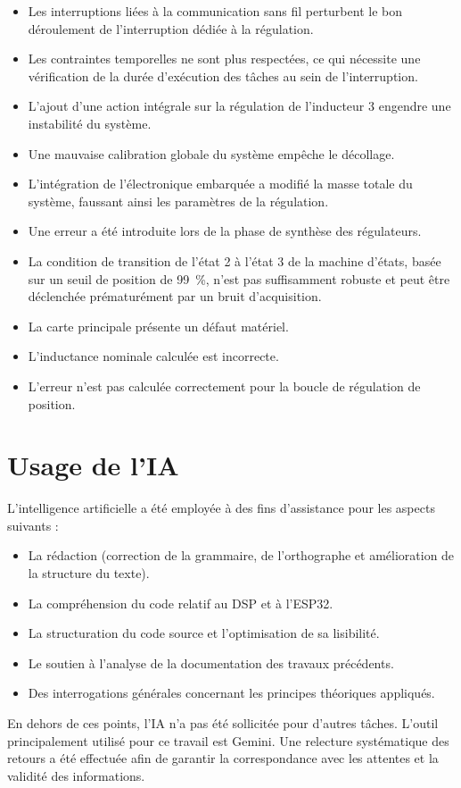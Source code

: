 \begin{itemize}
    \item Les interruptions liées à la communication sans fil perturbent le bon déroulement de l'interruption dédiée à la régulation.
    \item Les contraintes temporelles ne sont plus respectées, ce qui nécessite une vérification de la durée d'exécution des tâches au sein de l'interruption.
    \item L'ajout d'une action intégrale sur la régulation de l'inducteur 3 engendre une instabilité du système.
    \item Une mauvaise calibration globale du système empêche le décollage.
    \item L'intégration de l'électronique embarquée a modifié la masse totale du système, faussant ainsi les paramètres de la régulation.
    \item Une erreur a été introduite lors de la phase de synthèse des régulateurs.
    \item La condition de transition de l'état 2 à l'état 3 de la machine d'états, basée sur un seuil de position de 99~\%, n'est pas suffisamment robuste et peut être déclenchée prématurément par un bruit d'acquisition.
    \item La carte principale présente un défaut matériel.
    \item L'inductance nominale calculée est incorrecte.
    \item L'erreur n'est pas calculée correctement pour la boucle de régulation de position.
\end{itemize}

\section{Usage de l'IA}
L'intelligence artificielle a été employée à des fins d'assistance pour les aspects suivants :
\begin{itemize}
    \item La rédaction (correction de la grammaire, de l'orthographe et amélioration de la structure du texte).
    \item La compréhension du code relatif au DSP et à l'ESP32.
    \item La structuration du code source et l'optimisation de sa lisibilité.
    \item Le soutien à l'analyse de la documentation des travaux précédents.
    \item Des interrogations générales concernant les principes théoriques appliqués.
\end{itemize}

En dehors de ces points, l'IA n'a pas été sollicitée pour d'autres tâches. L'outil principalement utilisé pour ce travail est Gemini. Une relecture systématique des retours a été effectuée afin de garantir la correspondance avec les attentes et la validité des informations.